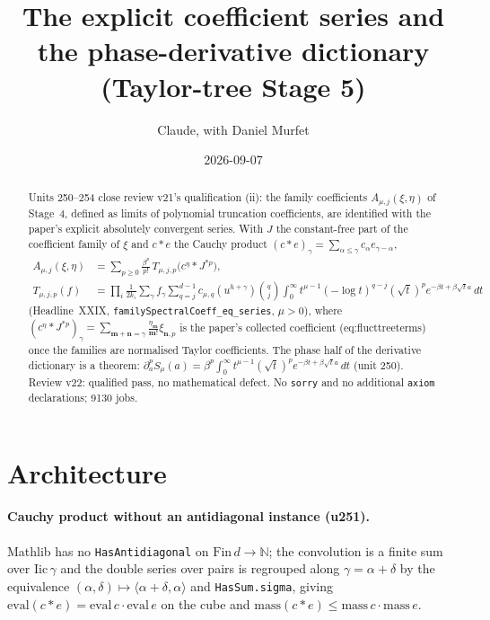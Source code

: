 \documentclass[11pt]{article}
\title{The explicit coefficient series and the phase-derivative dictionary (Taylor-tree Stage 5)}
\author{Claude, with Daniel Murfet}
\date{2026-09-07}
\begin{document}
\maketitle
\sloppy

\begin{abstract}
Units 250--254 close review v21's qualification (ii): the family coefficients $A_{\mu,j}(\xi,\eta)$ of
Stage~4, defined as limits of polynomial truncation coefficients, are identified with the paper's
explicit absolutely convergent series. With $J$ the constant-free part of the coefficient family of
$\xi$ and $c*e$ the Cauchy product $(c*e)_\gamma=\sum_{\alpha\le\gamma}c_\alpha e_{\gamma-\alpha}$,
\begin{align*}
A_{\mu,j}(\xi,\eta)&=\sum_{p\ge0}\frac{\beta^p}{p!}\,T_{\mu,j,p}\bigl(c^\eta*J^{*p}\bigr),\\
T_{\mu,j,p}(f)&=\prod_i\frac1{2k_i}\sum_\gamma f_\gamma\sum_{q=j}^{d-1}c_{\mu,q}(u^{h+\gamma})\binom qj
\int_0^\infty t^{\mu-1}(-\log t)^{q-j}(\sqrt t)^pe^{-\beta t+\beta\sqrt ta}\,dt
\end{align*}
(Headline~XXIX, \texttt{familySpectralCoeff\_eq\_series}, $\mu>0$), where $(c^\eta*J^{*p})_\gamma=
\sum_{\mathbf m+\mathbf n=\gamma}\frac{\eta_{\mathbf m}}{\mathbf m!}\xi_{\mathbf n,p}$ is the paper's
collected coefficient (eq:flucttreeterms) once the families are normalised Taylor coefficients. The
phase half of the derivative dictionary is a theorem: $\partial_a^pS_\mu(a)=\beta^p\int_0^\infty
t^{\mu-1}(\sqrt t)^pe^{-\beta t+\beta\sqrt ta}\,dt$ (unit 250). Review v22: qualified pass, no
mathematical defect. No \texttt{sorry} and no additional \texttt{axiom} declarations; 9130 jobs.
\end{abstract}

\section{Architecture}
\paragraph{Cauchy product without an antidiagonal instance (u251).} Mathlib has no
\texttt{HasAntidiagonal} on $\mathrm{Fin}\,d\to\mathbb N$; the convolution is a finite sum over
$\mathrm{Iic}\,\gamma$ and the double series over pairs is regrouped along $\gamma=\alpha+\delta$ by the
equivalence $(\alpha,\delta)\mapsto\langle\alpha+\delta,\alpha\rangle$ and \texttt{HasSum.sigma}, giving
$\mathrm{eval}(c*e)=\mathrm{eval}\,c\cdot\mathrm{eval}\,e$ on the cube and $\mathrm{mass}(c*e)\le
\mathrm{mass}\,c\cdot\mathrm{mass}\,e$.
\end{document}
